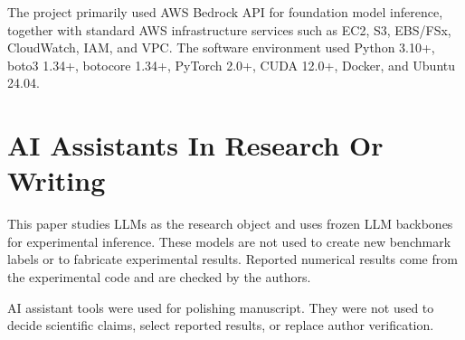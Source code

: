 The project primarily used AWS Bedrock API for foundation model inference, together with standard AWS infrastructure services such as EC2, S3, EBS/FSx, CloudWatch, IAM, and VPC. The software environment used Python 3.10+, boto3 1.34+, botocore 1.34+, PyTorch 2.0+, CUDA 12.0+, Docker, and Ubuntu 24.04.

\section{AI Assistants In Research Or Writing}

This paper studies LLMs as the research object and uses frozen LLM backbones
for experimental inference. These models are not used to create new benchmark
labels or to fabricate experimental results. Reported numerical results come
from the experimental code and are checked by the authors.

AI assistant tools were used for polishing manuscript. They were not used to
decide scientific claims, select reported results, or replace author
verification.